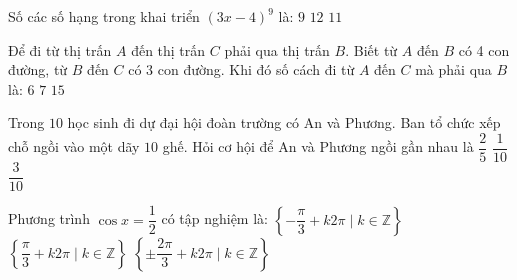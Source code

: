 \begin{ex}%
	Số các số hạng trong khai triển $\left(3x-4\right)^9$ là: 
	\choice
	{$9$}
	{}
	{$12$}
	{$11$}
\end{ex}
\begin{ex}%
	Để đi từ thị trấn $A$ đến thị trấn $C$ phải qua thị trấn $B$. Biết từ $A$ đến $B$ có 4 con đường, từ $B$ đến $C$ có 3 con đường. Khi đó số cách đi từ $A$ đến $C$ mà phải qua $B$ là:
	\choice
	{$6$}
	{$7$}
	{$15$}
	{}
\end{ex}
\begin{ex}%
	Trong $10$ học sinh đi dự đại hội đoàn trường có An và Phương. Ban tổ chức xếp chỗ ngồi vào một dãy $10$ ghế. Hỏi cơ hội để An và Phương ngồi gần nhau là
	\choice
	{$\dfrac{2}{5}$}
	{$\dfrac{1}{10}$}
	{$\dfrac{3}{10}$}
	{}
\end{ex}
\begin{ex}%
	Phương trình $\cos x=\dfrac{1}{2}$ có tập nghiệm là:
	\choice
	{$\left\{-\dfrac{\pi}{3}+k2\pi \mid k \in \mathbb{Z} \right\}$}
	{}
	{$\left\{\dfrac{\pi}{3}+k2\pi \mid k \in \mathbb{Z} \right\}$}
	{$\left\{\pm \dfrac{2\pi}{3}+k2\pi \mid k \in \mathbb{Z} \right\}$}
\end{ex}

